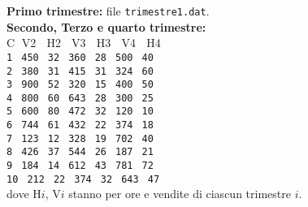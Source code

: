 \documentclass[11pt]{article}
\begin{document}
\begin{mdframed}[backgroundcolor=panna]
{\bf Primo trimestre:} file \texttt{trimestre1.dat}.
\\
{\bf Secondo, Terzo e quarto trimestre:}
\\
 C $\;$V2  $\;$ H2 $\;$ V3 $\;$ H3 $\;$   V4 $\;$ H4\\
\texttt{1$\;$          450$\;$             32$\;$       360$\;$         28$\;$            500$\;$        40 \\
           2$\;$         380$\;$             31$\;$        415$\;$         31$\;$            324$\;$        60 \\
           3$\;$          900$\;$             52$\;$        320$\;$         15$\;$            400$\;$        50\\
           4$\;$          800$\;$             60$\;$        643$\;$         28$\;$            300$\;$        25\\
           5$\;$         600$\;$             80$\;$        472$\;$         32$\;$            120$\;$        10\\
           6$\;$         744$\;$             61$\;$        432$\;$         22$\;$            374$\;$        18\\ 
           7$\;$        123$\;$             12$\;$        328$\;$         19$\;$            702$\;$        40\\ 
           8$\;$        426$\;$             37$\;$        544$\;$         26$\;$            187$\;$        21\\
           9$\;$        184$\;$             14$\;$        612$\;$         43$\;$            781$\;$        72\\
           10$\;$      212$\;$         22$\;$        374$\;$         32$\;$            643$\;$        47\\}
dove H$i$, V$i$ stanno per ore e vendite di ciascun trimestre $i$.
\end{mdframed}
\end{document}
